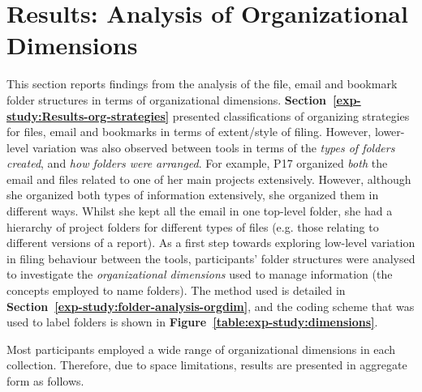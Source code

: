 \newpage
\section{Results: Analysis of Organizational Dimensions}
\label{exp-study:Results-org-dims}

This section reports findings from the analysis of the file, email and bookmark folder structures in terms of organizational dimensions. \textbf{Section~\ref{exp-study:Results-org-strategies}} presented classifications of organizing strategies for files, email and bookmarks in terms of extent/style of filing. %
However, lower-level variation was also observed between tools in terms of the \textit{types of folders created}, and \textit{how folders were arranged}.  For example, P17 organized \textit{both} the email and files related to one of her main projects extensively.  However, although she organized both types of information extensively, she organized them in different ways.  Whilst she kept all the email in one top-level folder, she had a hierarchy of project folders for different types of files (e.g. those relating to different versions of a report).  As a first step towards exploring low-level variation in filing behaviour between the tools, participants' folder structures were analysed to investigate the \textit{organizational dimensions} used to manage information (the concepts employed to name folders). The method used is detailed in \textbf{Section~\ref{exp-study:folder-analysis-orgdim}}, and the coding scheme that was used to label folders is shown in \textbf{Figure~\ref{table:exp-study:dimensions}}.

Most participants employed a wide range of organizational dimensions in each collection.  Therefore, due to space limitations, results are presented in aggregate form as follows.  

